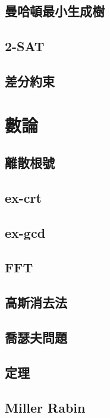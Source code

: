 \documentclass[a4paper,10pt,twocolumn,oneside]{article}
\begin{document}
\subsection{曼哈頓最小生成樹}


\subsection{2-SAT}

\subsection{差分約束}

\section{數論}
\subsection{離散根號}

\subsection{ex-crt}

\subsection{ex-gcd}

\subsection{FFT}

\subsection{高斯消去法}

\subsection{喬瑟夫問題}

\subsection{定理}

\subsection{Miller Rabin}

\end{document}
